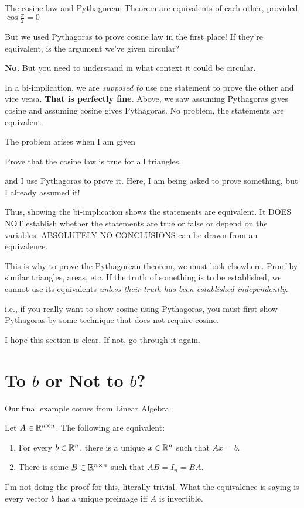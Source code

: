 The cosine law and Pythagorean Theorem are equivalents of each other, provided $\cos \frac \pi 2 = 0$

But we used Pythagoras to prove cosine law in the first place! If they're equivalent, is the argument we've given circular?

\textbf{No.} But you need to understand in what context it could be circular.

In a bi-implication, we are \textit{supposed to} use one statement to prove the other and vice versa. \textbf{That is perfectly fine}. Above, we saw assuming Pythagoras gives cosine and assuming cosine gives Pythagoras. No problem, the statements are equivalent.

The problem arises when I am given
\begin{SNP}{\xmp}Prove that the cosine law is true for all triangles.
\end{SNP}
and I use Pythagoras to prove it. Here, I am being asked to prove something, but I already assumed it!

Thus, showing the bi-implication shows the statements are equivalent. It DOES NOT establish whether the statements are true or false or depend on the variables. ABSOLUTELY NO CONCLUSIONS can be drawn from an equivalence.

This is why to prove the Pythagorean theorem, we must look elsewhere. Proof by similar triangles, areas, etc. If the truth of something is to be established, we cannot use its equivalents \textit{unless their truth has been established independently}.

i.e., if you really want to show cosine using Pythagoras, you must first show Pythagoras by some technique that does not require cosine.

I hope this section is clear. If not, go through it again.
\section*{To $b$ or Not to $b$?}
Our final example comes from Linear Algebra.
\begin{SNP}{\thm}Let $A \in \mathbb{R}^{n \times n}$. The following are equivalent:
\begin{enumerate}
    \item For every $b \in \mathbb{R}^n$, there is a unique $x \in \mathbb{R}^n$ such that $Ax = b$.
    \item There is some $B \in \mathbb{R}^{n \times n}$ such that $AB = I_n = BA$.
\end{enumerate}
\end{SNP}
I'm not doing the proof for this, literally trivial. What the equivalence is saying is every vector $b$ has a unique preimage iff $A$ is invertible.

